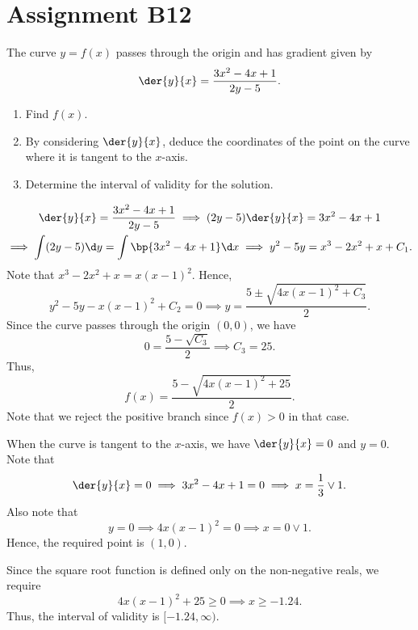 \section{Assignment B12}

\begin{problem}
    The curve $y = f(x)$ passes through the origin and has gradient given by \[\der{y}{x} = \frac{3x^2-4x+1}{2y-5}.\]
    \begin{enumerate}
        \item Find $f(x)$.
        \item By considering $\der{y}{x}$, deduce the coordinates of the point on the curve where it is tangent to the $x$-axis.
        \item Determine the interval of validity for the solution.
    \end{enumerate}
\end{problem}
\begin{solution}
    \begin{ppart}
        \begin{gather*}
            \der{y}{x} = \frac{3x^2-4x+1}{2y-5} \implies (2y-5)\der{y}{x} = 3x^2 - 4x + 1\\
            \implies \int (2y-5) \d y = \int \bp{3x^2 - 4x + 1} \d x \implies y^2 - 5y = x^3 - 2x^2 + x + C_1.
        \end{gather*}
        Note that $x^3 - 2x^2 + x = x(x-1)^2$. Hence, \[y^2 - 5y - x(x-1)^2 + C_2 = 0 \implies y = \frac{5 \pm \sqrt{4x(x-1)^2 + C_3}}{2}.\] Since the curve passes through the origin $(0, 0)$, we have \[0 = \frac{5 - \sqrt{C_3}}{2} \implies C_3 = 25.\] Thus, \[f(x) = \frac{5-\sqrt{4x(x-1)^2 + 25}}{2}.\] Note that we reject the positive branch since $f(x) > 0$ in that case.
    \end{ppart}
    \begin{ppart}
        When the curve is tangent to the $x$-axis, we have $\der{y}{x} = 0$ and $y = 0$. Note that \[\der{y}{x} = 0 \implies 3x^2 - 4x + 1 = 0 \implies x = \frac13 \lor 1.\] Also note that \[y = 0 \implies 4x(x-1)^2 = 0 \implies x = 0 \lor 1.\] Hence, the required point is $(1, 0)$.
    \end{ppart}
    \begin{ppart}
        Since the square root function is defined only on the non-negative reals, we require \[4x(x-1)^2 + 25 \geq 0 \implies x \geq -1.24.\] Thus, the interval of validity is $[-1.24, \infty)$.
    \end{ppart}
\end{solution}


